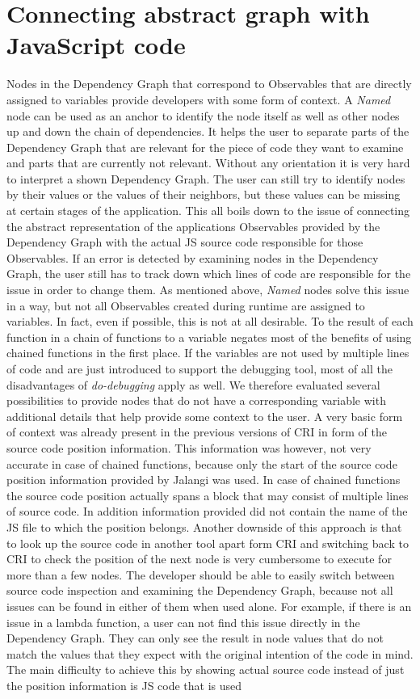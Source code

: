 \section{Connecting abstract graph with JavaScript code}
Nodes in the Dependency Graph that correspond to Observables that are directly assigned to variables provide developers with some form of context. A \emph{Named} node can be used as an anchor to identify the node itself as well as other nodes up and down the chain of dependencies. It helps the user to separate parts of the Dependency Graph that are relevant for the piece of code they want to examine and parts that are currently not relevant. Without any orientation it is very hard to interpret a shown Dependency Graph. The user can still try to identify nodes by their values or the values of their neighbors, but these values can be missing at certain stages of the application. This all boils down to the issue of connecting the abstract representation of the applications Observables provided by the Dependency Graph with the actual JS source code responsible for those Observables. If an error is detected by examining nodes in the Dependency Graph, the user still has to track down which lines of code are responsible for the issue in order to change them. As mentioned above, \emph{Named} nodes solve this issue in a way, but not all Observables created during runtime are assigned to variables. In fact, even if possible, this is not at all desirable. To the result of each function in a chain of functions to a variable negates most of the benefits of using chained functions in the first place. If the variables are not used by multiple lines of code and are just introduced to support the debugging tool, most of all the disadvantages of \emph{do-debugging} apply as well. We therefore evaluated several possibilities to provide nodes that do not have a corresponding variable with additional details that help provide some context to the user. A very basic form of context was already present in the previous versions of CRI in form of the source code position information. This information was however, not very accurate in case of chained functions, because only the start of the source code position information provided by Jalangi was used. In case of chained functions the source code position actually spans a block that may consist of multiple lines of source code. In addition information provided did not contain the name of the JS file to which the position belongs. Another downside of this approach is that to look up the source code in another tool apart form CRI and switching back to CRI to check the position of the next node is very cumbersome to execute for more than a few nodes. The developer should be able to easily switch between source code inspection and examining the Dependency Graph, because not all issues can be found in either of them when used alone. For example, if there is an issue in a lambda function, a user can not find this issue directly in the Dependency Graph. They can only see the result in node values that do not match the values that they expect with the original intention of the code in mind. The main difficulty to achieve this by showing actual source code instead of just the position information is JS code that is used 